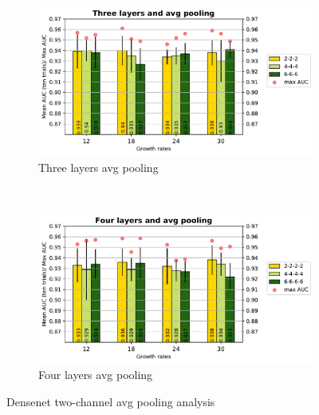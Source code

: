 \begin{figure}
    \centering
    \begin{subfigure}[b]{0.4\textwidth}
        \includegraphics[width=\textwidth]{images/densenet/simple/densenet_simple_three_layer_avg_bar}
        \caption{Three layers avg pooling }
        \label{fig:densenet_simple_three_layer_avg_bar}
    \end{subfigure}
    ~ %
    \begin{subfigure}[b]{0.4\textwidth}
        \includegraphics[width=\textwidth]{images/densenet/simple/densenet_simple_four_layer_avg_bar}
        \caption{Four layers avg pooling}
       \label{fig:densenet_simple_four_layer_avg_bar}
    \end{subfigure}        
    \caption{Densenet two-channel avg pooling analysis}
    \label{fig:dense_avg_pooling_1}
\end{figure}

